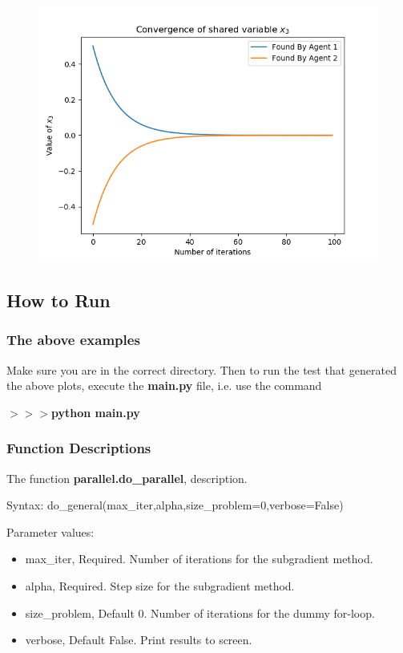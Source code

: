 \documentclass[12pt]{article}
\begin{document}
\begin{figure}[H]
	\includegraphics[scale=1]{Problem1-Convergence.png}
\end{figure}

\subsection*{How to Run}

\subsubsection*{The above examples}

Make sure you are in the correct directory. Then to run the test that generated the above plots, execute the \textbf{main.py} file, i.e. use the command

\noindent \textbf{$>>>$python main.py}

\subsubsection*{Function Descriptions}

The function \textbf{parallel.do\_parallel}, description.

Syntax: do\_general(max\_iter,alpha,size\_problem=0,verbose=False)

Parameter values:
\begin{itemize}
	\item max\_iter, Required. Number of iterations for the subgradient method.
	\item alpha, Required. Step size for the subgradient method.
	\item size\_problem, Default 0. Number of iterations for the dummy for-loop.
	\item verbose, Default False. Print results to screen.
\end{itemize}
\end{document}
